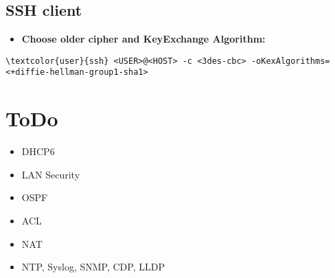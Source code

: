 \documentclass[10pt, a4paper, onecolumn, oneside, titlepage, openany]{book}
\begin{document}
\section{SSH client}
\begin{itemize}
    \item \textbf{Choose older cipher and KeyExchange Algorithm:}
\end{itemize}
\begin{Verbatim}[commandchars=\\\{\}]
\textcolor{user}{ssh} <USER>@<HOST> -c <3des-cbc> -oKexAlgorithms=<+diffie-hellman-group1-sha1>
\end{Verbatim}





\chapter{ToDo}
\begin{itemize}
    \item DHCP6
    \item LAN Security
    \item OSPF
    \item ACL
    \item NAT
    \item NTP, Syslog, SNMP, CDP, LLDP
\end{itemize}
\end{document}
